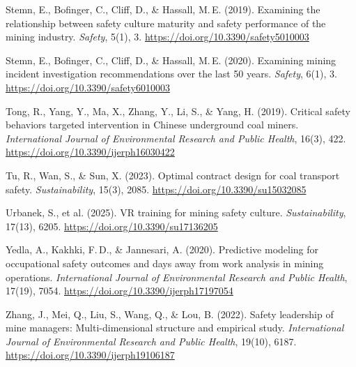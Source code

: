 \documentclass[12pt,a4paper]{article}
\begin{document}
Stemn, E., Bofinger, C., Cliff, D., \& Hassall, M.\,E. (2019). Examining the relationship between safety culture maturity and safety performance of the mining industry. \textit{Safety}, 5(1), 3. \url{https://doi.org/10.3390/safety5010003}

Stemn, E., Bofinger, C., Cliff, D., \& Hassall, M.\,E. (2020). Examining mining incident investigation recommendations over the last 50 years. \textit{Safety}, 6(1), 3. \url{https://doi.org/10.3390/safety6010003}

Tong, R., Yang, Y., Ma, X., Zhang, Y., Li, S., \& Yang, H. (2019). Critical safety behaviors targeted intervention in Chinese underground coal miners. \textit{International Journal of Environmental Research and Public Health}, 16(3), 422. \url{https://doi.org/10.3390/ijerph16030422}

Tu, R., Wan, S., \& Sun, X. (2023). Optimal contract design for coal transport safety. \textit{Sustainability}, 15(3), 2085. \url{https://doi.org/10.3390/su15032085}

Urbanek, S., et al. (2025). VR training for mining safety culture. \textit{Sustainability}, 17(13), 6205. \url{https://doi.org/10.3390/su17136205}

Yedla, A., Kakhki, F.\,D., \& Jannesari, A. (2020). Predictive modeling for occupational safety outcomes and days away from work analysis in mining operations. \textit{International Journal of Environmental Research and Public Health}, 17(19), 7054. \url{https://doi.org/10.3390/ijerph17197054}

Zhang, J., Mei, Q., Liu, S., Wang, Q., \& Lou, B. (2022). Safety leadership of mine managers: Multi-dimensional structure and empirical study. \textit{International Journal of Environmental Research and Public Health}, 19(10), 6187. \url{https://doi.org/10.3390/ijerph19106187}

\endgroup
\end{document}
